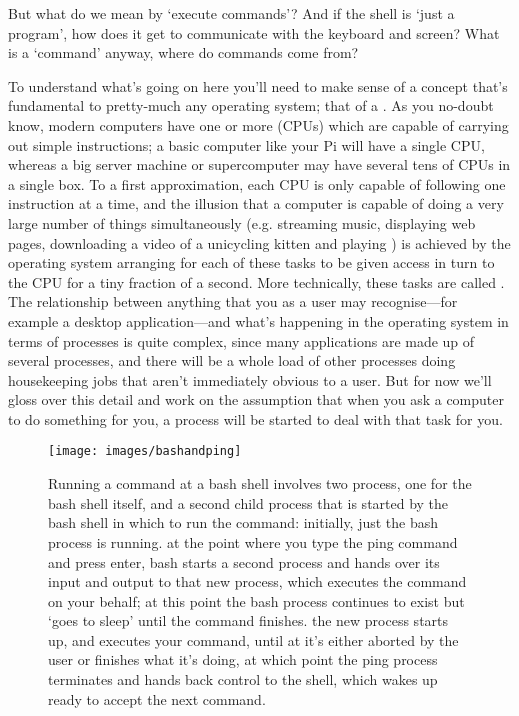 But what do we mean by `execute commands'? And if the shell is `just a program', how does it get to communicate with the keyboard and screen? What is a `command' anyway, where do commands come from?

To understand what's going on here you'll need to make sense of a concept that's fundamental to pretty-much any operating system; that of a . As you no-doubt know, modern computers have one or more  (CPUs) which are capable of carrying out simple instructions; a basic computer like your Pi will have a single CPU, whereas a big server machine or supercomputer may have several tens of CPUs in a single box. To a first approximation, each CPU is only capable of following one instruction at a time, and the illusion that a computer is capable of doing a very large number of things simultaneously (e.g. streaming music, displaying web pages, downloading a video of a unicycling kitten and playing ) is achieved by the operating system arranging for each of these tasks to be given access in turn to the CPU for a tiny fraction of a second. More technically, these tasks are called . The relationship between anything that you as a user may recognise---for example a desktop application---and what's happening in the operating system in terms of processes is quite complex, since many applications are made up of several processes, and there will be a whole load of other processes doing housekeeping jobs that aren't immediately obvious to a user. But for now we'll gloss over this detail and work on the assumption that when you ask a computer to do something for you, a process will be started to deal with that task for you.

\begin{figure}
\centerline{\texttt{[image: images/bashandping]}}
\caption{Running a command at a bash shell involves two process, one for the bash shell itself, and a second child process that is started by the bash shell in which to run the command: \protect{} initially, just the bash process is running. \protect{} at the point where you type the ping command and press enter, bash starts a second process and hands over its input and output to that new process, which executes the command on your behalf; at this point the bash process continues to exist but `goes to sleep' until the command finishes. \protect{} the new process starts up, and executes your command, until at \protect{} it's either aborted by the user or finishes what it's doing, at which point \protect{} the ping process terminates and hands back control to the shell, which wakes up ready to accept the next command.}\label{figure:bashandping}
\label{fig:bashandping}
\end{figure}


